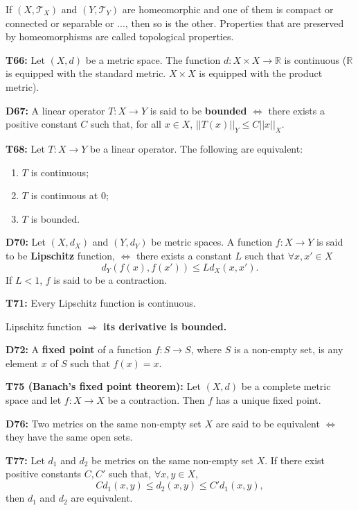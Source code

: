 \documentclass[twocolumn,10pt]{article}
\begin{document}
If $(X,\mathcal{T}_X)$ and $(Y,\mathcal{T}_Y)$ are homeomorphic and one of them is compact or connected or separable or ..., then so is the other. Properties that are preserved by homeomorphisms are called topological properties.

\textbf{T66:} Let $(X,d)$ be a metric space. The function $d:X\times X\to\mathbb{R}$ is continuous ($\mathbb{R}$ is equipped with the standard metric. $X\times X$ is equipped with the product metric).

\textbf{D67:} A linear operator $T:X\to Y$ is said to be \textbf{bounded} $\Leftrightarrow$ there exists a positive constant $C$ such that, for all $x\in X$, $||T(x)||_Y\leq C||x||_X$.

\textbf{T68:} Let $T:X\to Y$ be a linear operator. The following are equivalent:
\begin{enumerate}
    \item $T$ is continuous;
    \item $T$ is continuous at $0$;
    \item $T$ is bounded.
\end{enumerate}
\textbf{D70:} Let $(X,d_X)$ and $(Y,d_Y)$ be metric spaces. A function $f:X\to Y$ is said to be \textbf{Lipschitz} function, $\Leftrightarrow$ there exists a constant $L$ such that $\forall x,x'\in X$
\begin{equation*}
    d_Y(f(x),f(x')) \leq Ld_X(x,x').
\end{equation*}
If $L<1$, $f$ is said to be a contraction.

\textbf{T71:} Every Lipschitz function is continuous.

Lipschitz function $\Rightarrow$ \textbf{its derivative is bounded.}

\textbf{D72:} A \textbf{fixed point} of a function $f:S\to S$, where $S$ is a non-empty set, is any element $x$ of $S$ such that $f(x)=x$.

\textbf{T75 (Banach's fixed point theorem):} Let $(X,d)$ be a complete metric space and let $f:X\to X$ be a contraction. Then $f$ has a unique fixed point.

\textbf{D76:} Two metrics on the same non-empty set $X$ are said to be equivalent $\Leftrightarrow$ they have the same open sets.

\textbf{T77:} Let $d_1$ and $d_2$ be metrics on the same non-empty set $X$. If there exist positive constants $C,C'$ such that, $\forall x,y\in X$,
\begin{equation*}
    Cd_1(x,y) \leq d_2(x,y) \leq C'd_1(x,y),
\end{equation*}
then $d_1$ and $d_2$ are equivalent.
\end{document}
